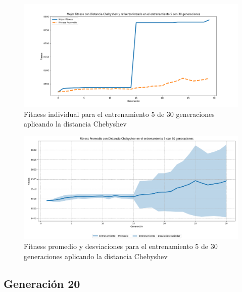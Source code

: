 \documentclass[conference]{IEEEtran}
\begin{document}
\begin{figure}[H]
    \centering
    \includegraphics[width=0.9 \linewidth]{Chebyshev/Fitness_individual_30Gen/Fitness_5_Cheby_30Gen.png}
    \caption{Fitness individual para el entrenamiento 5 de 30 generaciones aplicando la distancia Chebyshev}
    \label{fig:cheb_5_30}
\end{figure}
\begin{figure}[H]
    \centering
    \includegraphics[width=0.9 \linewidth]{Chebyshev/Fitness_individual_30Gen/Fitness_5_Cheby_30Gen_Sombra.png}
    \caption{Fitness promedio y desviaciones para el entrenamiento 5 de 30 generaciones aplicando la distancia Chebyshev}
    \label{fig:cheb_5_30_sombra}
\end{figure}


\subsection{Generación 20}
\setcounter{figure}{0}
\renewcommand{\thefigure}{S\arabic{figure}C-C}
\end{document}
